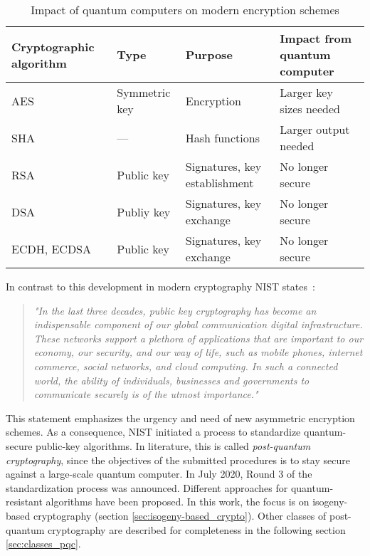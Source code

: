 \begin{table}[htpb]
  \centering
  \begin{tabular}{|K{3cm}|K{3cm}|K{4cm}|K{4cm}|}
	\hline
      \textbf{Cryptographic} \textbf{algorithm} & \textbf{Type} & \textbf{Purpose} & \textbf{Impact from} \textbf{ quantum computer} \\
	\hline
      AES & Symmetric key & Encryption & Larger key sizes needed \\
    \hline
      SHA & --- & Hash functions & Larger output needed \\
    \hline
      RSA & Public key & Signatures, key establishment & No longer secure \\
	\hline      
      DSA & Publiy key & Signatures, key exchange & No longer secure \\
    \hline
      ECDH, ECDSA & Public key & Signatures, key exchange & No longer secure \\
    \hline
  \end{tabular}
  \caption[Impact of quantum computers on modern encryption schemes]{Impact of quantum computers on modern encryption schemes}\label{tab:impact}
\end{table}

In contrast to this development in modern cryptography NIST states~\parencite{chen2016report}:
\begin{quote}
\textit{"In the last three decades, public key cryptography has become an indispensable component of our global communication digital infrastructure. These networks support a plethora of applications that are important to our economy, our security, and our way of life, such as mobile phones, internet commerce, social networks, and cloud computing. In such a connected world, the ability of individuals, businesses and governments to communicate securely is of the utmost importance."}
\end{quote}
This statement emphasizes the urgency and need of new asymmetric encryption schemes. As a consequence, NIST initiated a process to standardize quantum-secure public-key algorithms. In literature, this is called \textit{post-quantum cryptography}, since the objectives of the submitted procedures is to stay secure against a large-scale quantum computer. In July 2020, Round 3 of the standardization process was announced. Different approaches for quantum-resistant algorithms have been proposed. In this work, the focus is on isogeny-based cryptography (section \ref{sec:isogeny-based_crypto}). Other classes of post-quantum cryptography are described for completeness in the following section \ref{sec:classes_pqc}.

